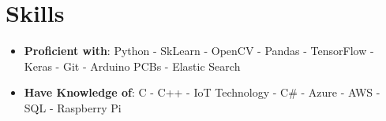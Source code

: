 \documentclass[letterpaper,11pt]{article}
\newcommand{\resumeSubHeadingListStart}{\begin{itemize}[leftmargin=*]}
\newcommand{\resumeSubHeadingListEnd}{\end{itemize}}
\begin{document}
\section{Skills}
  \resumeSubHeadingListStart
     \item{
    	\textbf{Proficient with}{: Python  -  SkLearn - OpenCV -  Pandas - TensorFlow - Keras - Git - Arduino PCBs - Elastic Search}
    }
    
    \item{
    	\textbf{Have Knowledge of}{: C - C++ - IoT Technology - C\# - Azure - AWS - SQL - Raspberry Pi}
    	
    }
 \resumeSubHeadingListEnd


\end{document}
